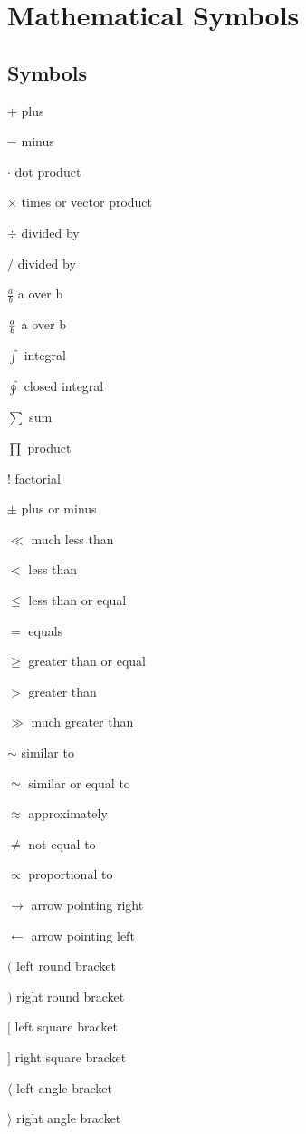 \documentclass[a4paper]{article}
\begin{document}
 

 
\section{Mathematical Symbols} 
 
\subsection{Symbols} 

$+$ plus 

$-$ minus 

$\cdot$ dot product 

$\times$ times or vector product 

$\div$ divided by 

$/$ divided by 

$\frac{a}{b}$ a over b 

${a}\over{b} $ a over b 

$\int$ integral 

$\oint$ closed integral 

$\sum$ sum 

$\prod$ product 

$!$ factorial 

$\pm$ plus or minus 

$\ll$ much less than 

$<$ less than 

$\le$ less than or equal 

$=$ equals 

$\ge$ greater than or equal 

$>$ greater than 

$\gg$ much greater than 

$\sim$ similar to 

$\simeq$ similar or equal to 

$\approx$ approximately 

$\ne$ not equal to 

$\propto$ proportional to 

$\rightarrow$ arrow pointing right 

$\leftarrow$ arrow pointing left 

$($ left round bracket 

$)$ right round bracket 

$[$ left square bracket 

$]$ right square bracket 

$\langle$ left angle bracket 

$\rangle$ right angle bracket 
\end{document}
